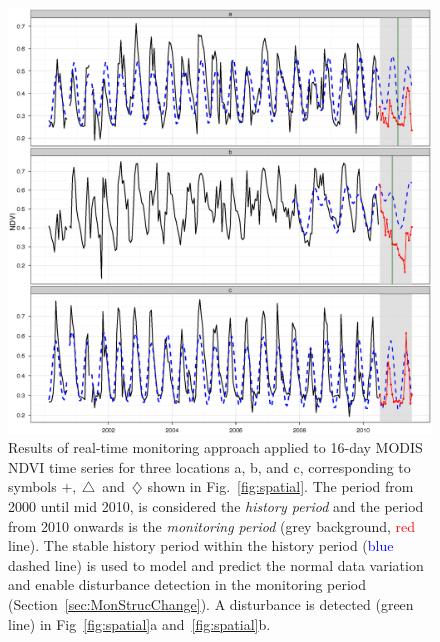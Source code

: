 \documentclass[authoryear,preprint,review,10pt]{elsarticle}
\begin{document}
\begin{figure}[htp]
\centering
    \includegraphics[width=1\textwidth]{figs/tsexampleSOM.eps}
  \caption{
 Results of real-time monitoring approach applied to 16-day MODIS NDVI time series for three locations a, b, and c, corresponding to symbols
 $+,~\triangle$~and~$\diamondsuit$ shown in Fig.~\ref{fig:spatial}. The period from 2000 until mid 2010, is considered the \emph{history period} and the
 period from 2010 onwards is the \emph{monitoring period} (grey background, \textcolor{red} {red} line). The stable history period within the
 history period (\textcolor{blue} {blue} dashed line) is used to model and predict the normal data variation and enable disturbance detection in the
 monitoring period (Section~\ref{sec:MonStrucChange}).  A disturbance is detected (\textcolor{OliveGreen} {green} line) in Fig~\ref{fig:spatial}a and~\ref{fig:spatial}b.}
  \label{fig:realmon}
\end{figure}
 
\end{document}
